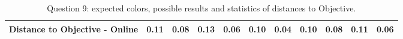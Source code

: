 \begin{table}[H]
{\begin{tabular}{lccccccccccccc}
    \multicolumn{4}{l}{Distance to Objective - Online}                                                                                               & \multicolumn{1}{|c}{0.11}        & \multicolumn{1}{c|}{0.08}    & \multicolumn{1}{|c}{0.13}        & \multicolumn{1}{c|}{0.06}    & \multicolumn{1}{|c}{\textbf{0.10}}       & \multicolumn{1}{c|}{0.04}    & \multicolumn{1}{|c}{\textbf{0.10}}        & \multicolumn{1}{c|}{0.08}    & \multicolumn{1}{|c}{0.11}       & \multicolumn{1}{c|}{0.06}    \\ \hline
    \end{tabular}}
  \caption[Question 9, with expected Results.]{Question 9: expected colors, possible results and statistics of distances to Objective.}
  \vspace{-5pt}
  \label{table:lab_q9_expected}
\end{table}
%
